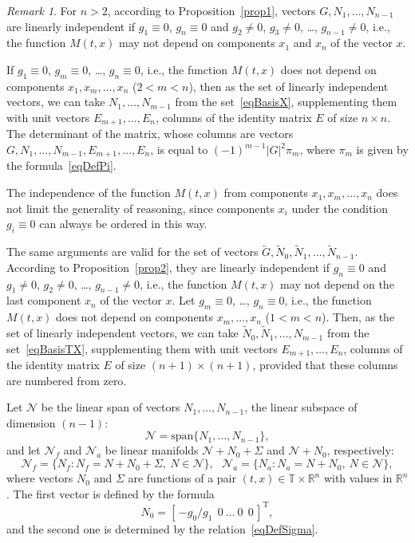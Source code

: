 \documentclass[10pt,reqno]{amsart}
\newcommand{\trans}{{\scriptscriptstyle \mathrm{T}}}
\theoremstyle{plain}
\theoremstyle{remark}
\newtheorem{Remark}{Remark}
\begin{document}
\begin{Remark}\label{rem2}
For $n > 2$, according to Proposition~\ref{prop1}, vectors $G,N_1,\dots,N_{n-1}$ are linearly independent if $g_1 \equiv 0$, $g_n \equiv 0$ and $g_2 \neq 0$, $g_3 \neq 0$, \dots, $g_{n-1} \neq 0$, i.e., the function $M(t,x)$ may not depend on components $x_1$ and $x_n$ of the vector $x$.

If $g_1 \equiv 0$, $g_m \equiv 0$, \dots, $g_n \equiv 0$, i.e., the function $M(t,x)$ does not depend on components $x_1,x_m,\dots,x_n$ ($2 < m < n$), then as the set of linearly independent vectors, we can take $N_1,\dots,N_{m-1}$ from the set~\eqref{eqBasisX}, supplementing them with unit vectors $E_{m+1},\dots,E_n$, columns of the identity matrix $E$ of size $n \times n$. The determinant of the matrix, whose columns are vectors $G,N_1,\dots,N_{m-1},E_{m+1},\dots,E_n$, is equal to $(-1)^{m-1} |G|^2 \pi_m$, where $\pi_m$ is given by the formula~\eqref{eqDefPi}.

The independence of the function $M(t,x)$ from components $x_1,x_m,\dots,x_n$ does not limit the generality of reasoning, since components $x_i$ under the condition $g_i \equiv 0$ can always be ordered in this way.

The same arguments are valid for the set of vectors $\tilde G,\tilde N_0,\tilde N_1,\dots,\tilde N_{n-1}$. According to Proposition~\ref{prop2}, they are linearly independent if $g_n \equiv 0$ and $g_1 \neq 0$, $g_2 \neq 0$, \dots, $g_{n-1} \neq 0$, i.e., the function $M(t,x)$ may not depend on the last component $x_n$ of the vector $x$. Let $g_m \equiv 0$, \dots, $g_n \equiv 0$, i.e., the function $M(t,x)$ does not depend on components $x_m,\dots,x_n$ ($1 < m < n$). Then, as the set of linearly independent vectors, we can take $\tilde N_0,\tilde N_1,\dots,N_{m-1}$ from the set~\eqref{eqBasisTX}, supplementing them with unit vectors $E_{m+1},\dots,E_n$, columns of the identity matrix $E$ of size $(n+1) \times (n+1)$, provided that these columns are numbered from zero.
\end{Remark}

Let $\mathcal{N}$ be the linear span of vectors $N_1,\dots,N_{n-1}$, the linear subspace of dimension $(n-1)$:
\[
  \mathcal{N} = \mathrm{span} \{ N_1,\dots,N_{n-1} \},
\]
and let $\mathcal{N}_f$ and $\mathcal{N}_a$ be linear manifolds $\mathcal{N} + N_0 + \Sigma$ and $\mathcal{N} + N_0$, respectively:
\[
  \mathcal{N}_f = \{ N_f \colon N_f = N + N_0 + \Sigma, ~ N \in \mathcal{N} \}, \ \ \ \mathcal{N}_a = \{ N_a \colon N_a = N + N_0, ~ N \in \mathcal{N} \},
\]
where vectors $N_0$ and $\Sigma$ are functions of a pair $(t,x) \in \mathds{T} \times \mathds{R}^n$ with values in $\mathds{R}^n$. The first vector is defined by the formula
\begin{equation}\label{eqDefN0}
  N_0 = [ \, {-g_0/g_1} \ \ 0 ~ \dots ~ 0 \ \ 0 \, ]^\trans,
\end{equation}
and the second one is determined by the relation~\eqref{eqDefSigma}.
\end{document}
